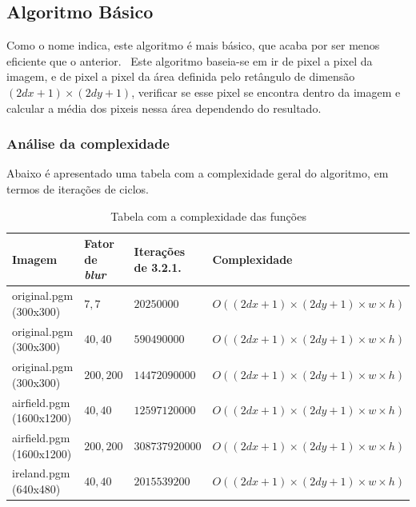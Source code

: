 \subsection{Algoritmo Básico}\label{subsec:blur2}
    \par Como o nome indica, este algoritmo é mais básico, que acaba por ser menos eficiente que o anterior. \ Este algoritmo baseia-se em ir de pixel a pixel da imagem, e de pixel a pixel da área definida pelo retângulo de dimensão $(2dx + 1) \times (2dy + 1)$, verificar se esse pixel se encontra dentro da imagem e calcular a média dos pixeis nessa área dependendo do resultado.

\subsubsection{Análise da complexidade}
    \par Abaixo é apresentado uma tabela com a complexidade geral do algoritmo, em termos de iterações de ciclos.

    \begin{table}[H]
        \centering
        \begin{tabular}{| p{23mm} | p{25mm} | p{30mm} | p{38mm} |}
            \hline

            \textbf{Imagem} & \textbf{Fator de \textit{blur}} & \textbf{Iterações de 3.2.1.} & \textbf{Complexidade} \\ \hline

            original.pgm (300x300) & $7,7$ & $20250000$ & $O((2dx + 1) \times (2dy + 1) \times w \times h)$ \\ \hline

            original.pgm (300x300) & $40,40$ & $590490000$ & $O((2dx + 1) \times (2dy + 1) \times w \times h)$ \\ \hline

            original.pgm (300x300) & $200,200$ & $14472090000$ & $O((2dx + 1) \times (2dy + 1) \times w \times h)$ \\ \hline

            airfield.pgm (1600x1200) & $40,40$ & $12597120000$ & $O((2dx + 1) \times (2dy + 1) \times w \times h)$ \\ \hline

            airfield.pgm (1600x1200) & $200,200$ & $308737920000$ & $O((2dx + 1) \times (2dy + 1) \times w \times h)$ \\ \hline

            ireland.pgm (640x480) & $40,40$ & $2015539200$ & $O((2dx + 1) \times (2dy + 1) \times w \times h)$ \\ \hline
        \end{tabular}
        \caption{Tabela com a complexidade das funções}
        \label{tab:complexidade2}
    \end{table}

